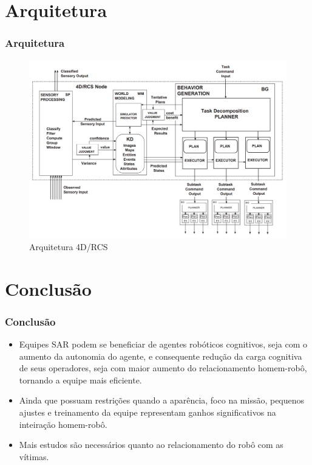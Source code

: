 \documentclass[aspectratio=169]{beamer}
\begin{document}
\section{Arquitetura}
\begin{frame}
\frametitle{Arquitetura}


\begin{figure}
  \centering
  \includegraphics[height=0.7\textheight]{4d-rcs.png}
  \caption{Arquitetura 4D/RCS \cite{albus2005rcs}}
\end{figure}

\end{frame}
\section{Conclusão}

\begin{frame}
\frametitle{Conclusão}
\begin{itemize}
\item Equipes SAR podem se beneficiar de agentes robóticos cognitivos, seja com o aumento da autonomia do agente, e consequente redução da carga cognitiva de seus operadores, seja com maior aumento do relacionamento homem-robô, tornando a equipe mais eficiente.

\item Ainda que possuam restrições quando a aparência, foco na missão, pequenos ajustes e treinamento da equipe representam ganhos significativos na inteiração homem-robô.

\item Mais estudos são necessários quanto ao relacionamento do robô com as vítimas. 
\end{itemize}
\end{frame}
\end{document}
